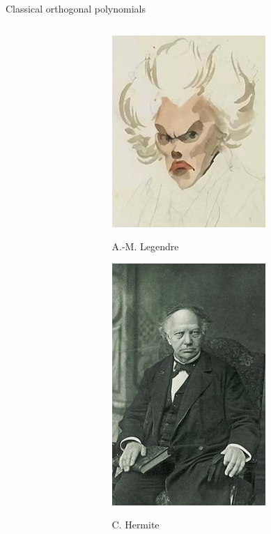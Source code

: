 \documentclass[english,aspectratio=169]{beamer}
\begin{document}
\begin{frame}[fragile]{Classical orthogonal polynomials}
\begin{columns}[T,onlytextwidth]
\begin{column}{0.70\textwidth}
    \end{column}
    \begin{column}{0.30\textwidth}
      \begin{figure}[ht] 
        \begin{minipage}[b]{0.5\linewidth}
          \centering
          \includegraphics[height=.3\textheight]{./figures/Legendre}\par 
          {\tiny A.-M. Legendre}
          \vspace{0.5ex}
        \end{minipage}%
        \begin{minipage}[b]{0.5\linewidth}
          \centering
          \includegraphics[height=.3\textheight]{./figures/Hermite}\par
          {\tiny C. Hermite}
          \vspace{0.5ex}
        \end{minipage} 
        \begin{minipage}[b]{0.5\linewidth}

\end{minipage}
\end{figure}
\end{column}
\end{columns}
\end{frame}
\end{document}
